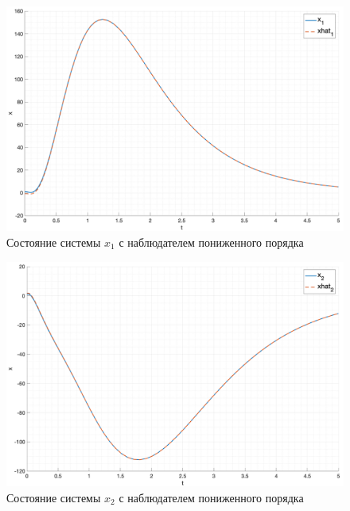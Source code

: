 \begin{figure}
    \centering
    \includegraphics[width=\textwidth]{media/plots/task4_x1_1.png}
    \caption{Состояние системы $x_1$ с наблюдателем пониженного порядка}
    \label{fig:task4_x1_1}
\end{figure}

\begin{figure}
    \centering
    \includegraphics[width=\textwidth]{media/plots/task4_x2_1.png}
    \caption{Состояние системы $x_2$ с наблюдателем пониженного порядка}
    \label{fig:task4_x2_1}
\end{figure}

